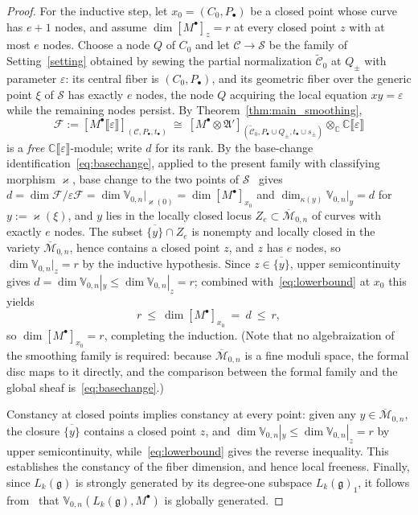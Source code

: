\documentclass[12pt,a4paper,reqno]{amsart}
\numberwithin{equation}{section}
\theoremstyle{definition}
\newcommand{\g}{\mathfrak{g}}
\newcommand{\C}{\mathbb{C}}
\renewcommand{\S}{\mathcal{S}}
\newcommand{\M}{\mathcal{M}}
\newcommand{\CCC}{\mathscr{C}}
\newcommand{\lb}{\llbracket}
\newcommand{\rb}{\rrbracket}
\def\o{\otimes}
\def\ra{\rightarrow}
\def\fA{\mathfrak{A}}
\def\VV{\mathbb{V}}
\begin{document}
\begin{proof}
    For the inductive step, let $x_0=(C_0,P_\bullet)$ be a closed point whose curve has $e+1$ nodes, and assume $\dim[M^\bullet]_z=r$ at every closed point $z$ with at most $e$ nodes. Choose a node $Q$ of $C_0$ and let $\CCC\ra\S$ be the family of Setting~\ref{setting} obtained by sewing the partial normalization $\widetilde{\CCC}_0$ at $Q_\pm$ with parameter $\varepsilon$: its central fiber is $(C_0,P_\bullet)$, and its geometric fiber over the generic point $\xi$ of $\S$ has exactly $e$ nodes, the node $Q$ acquiring the local equation $xy=\varepsilon$ while the remaining nodes persist. By Theorem~\ref{thm:main_smoothing},
    \[
    \mathcal F:=[M^\bullet\lb\varepsilon\rb]_{(\CCC,P_\bullet,t_\bullet)}\ \cong\ [M^\bullet\o\fA']_{(\widetilde{\CCC}_0,P_\bullet\cup Q_\pm,t_\bullet\cup s_\pm)}\o_\C\C\lb\varepsilon\rb
    \]
    is a \emph{free} $\C\lb\varepsilon\rb$-module; write $d$ for its rank. By the base-change identification~\eqref{eq:basechange}, applied to the present family with classifying morphism $\varkappa$, base change to the two points of $\S$~\cite[Lemma 4.1.1]{DGK2} gives $d=\dim \mathcal F/\varepsilon\mathcal F=\dim\VV_{0,n}|_{\varkappa(0)}=\dim[M^\bullet]_{x_0}$ and $\dim_{\kappa(y)}\VV_{0,n}|_y=d$ for $y:=\varkappa(\xi)$, and $y$ lies in the locally closed locus $Z_e\subset\overline{\M}_{0,n}$ of curves with exactly $e$ nodes. The subset $\overline{\{y\}}\cap Z_e$ is nonempty and locally closed in the variety $\overline{\M}_{0,n}$, hence contains a closed point $z$, and $z$ has $e$ nodes, so $\dim\VV_{0,n}|_z=r$ by the inductive hypothesis. Since $z\in\overline{\{y\}}$, upper semicontinuity gives $d=\dim\VV_{0,n}|_y\leq \dim\VV_{0,n}|_z=r$; combined with~\eqref{eq:lowerbound} at $x_0$ this yields
    \[
    r\ \leq\ \dim[M^\bullet]_{x_0}\ =\ d\ \leq\ r,
    \]
    so $\dim[M^\bullet]_{x_0}=r$, completing the induction. (Note that no algebraization of the smoothing family is required: because $\overline{\M}_{0,n}$ is a fine moduli space, the formal disc maps to it directly, and the comparison between the formal family and the global sheaf is~\eqref{eq:basechange}.)

    Constancy at closed points implies constancy at every point: given any $y\in\overline{\M}_{0,n}$, the closure $\overline{\{y\}}$ contains a closed point $z$, and $\dim\VV_{0,n}|_y\leq\dim\VV_{0,n}|_z=r$ by upper semicontinuity, while~\eqref{eq:lowerbound} gives the reverse inequality. This establishes the constancy of the fiber dimension, and hence local freeness. Finally, since $L_k(\g)$ is strongly generated by its degree-one subspace $L_k(\g)_1$, it follows from~\cite[Main theorem]{DG} that $\VV_{0,n}(L_k(\g),M^\bullet)$ is globally generated.
\end{proof}
\end{document}
